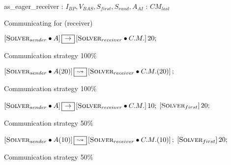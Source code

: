 \begin{algorithm}
\dontprintsemicolon
\SetNoline
{}
   as\_eager\_receiver\;
\algoindent {} : $I_{BP}, V_{BAS}, S_{first}, S_{rand}, A_{AI}$ \;
\algoindent {} : $CM_{last}$
\caption{Communicating \as{} for \SGP{} (receiver)}\label{as:golfers_receiver}
\end{algorithm}

\begin{algorithm}
\dontprintsemicolon
\SetNoline
$\left[\eqsolverposl{sender}\posldot A\right] \onetoone \left[\eqsolverposl{receiver}\posldot C.M.\right]20;$
\caption{Communication strategy \oneTone{} 100\%}\label{comm:golfers_1_1-1}
\end{algorithm}

\begin{algorithm}
\dontprintsemicolon
\SetNoline
$\left[\eqsolverposl{sender}\posldot A(20)\right] \oneton \left[\eqsolverposl{receiver}\posldot C.M.(20)\right];$
\caption{Communication strategy \oneTn{} 100\%}\label{comm:golfers_1_1-n}
\end{algorithm}

\begin{algorithm}
\dontprintsemicolon
\SetNoline
$\left[\eqsolverposl{sender}\posldot A\right] \onetoone \left[\eqsolverposl{receiver}\posldot C.M.\right]10;$\;
$\left[\textbf{{\sc Solver}}_{first}\right]20;$
\caption{Communication strategy \oneTone{} 50\%}\label{comm:golfers_1_1-1_50}
\end{algorithm}

\begin{algorithm}
\dontprintsemicolon
\SetNoline
$\left[\eqsolverposl{sender}\posldot A(10)\right] \oneton \left[\eqsolverposl{receiver}\posldot C.M.(10)\right];$\;
$\left[\textbf{{\sc Solver}}_{first}\right]20;$
\caption{Communication strategy \oneTn{} 50\%}\label{comm:golfers_1_1-n_50}
\end{algorithm}

